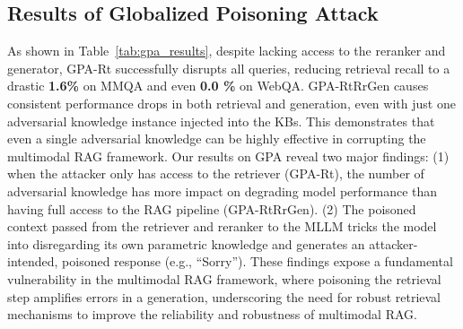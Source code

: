 

% 
\subsection{Results of Globalized Poisoning Attack}
As shown in Table~\ref{tab:gpa_results}, despite lacking access to the reranker and generator, GPA-Rt successfully disrupts all queries, reducing retrieval recall to a drastic \textbf{1.6\%} on MMQA and even \textbf{0.0 \%} on WebQA. GPA-RtRrGen causes consistent performance drops in both retrieval and generation, even with just one adversarial knowledge instance injected into the KBs. This demonstrates that even a single adversarial knowledge can be highly effective in corrupting the multimodal RAG framework. 
Our results on GPA reveal two major findings: (1) when the attacker only has access to the retriever (GPA-Rt), the number of adversarial knowledge has more impact on degrading model performance than having full access to the RAG pipeline (GPA-RtRrGen). (2) The poisoned context passed from the retriever and reranker to the MLLM tricks the model into disregarding its own parametric knowledge and generates an attacker-intended, poisoned response (e.g., ``Sorry''). These findings expose a fundamental vulnerability in the multimodal RAG framework, where poisoning the retrieval step amplifies errors in a generation, underscoring the need for robust retrieval mechanisms to improve the reliability and robustness of multimodal RAG.


